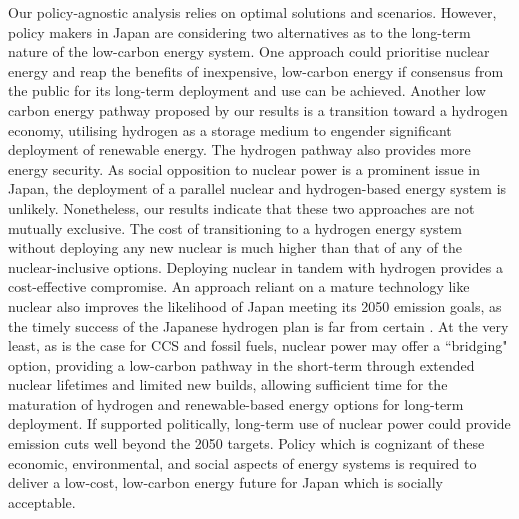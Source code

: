 Our policy-agnostic analysis relies on optimal solutions and scenarios. However, policy makers in Japan are considering two alternatives as to the long-term nature of the low-carbon energy system. One approach could prioritise nuclear energy and reap the benefits of inexpensive, low-carbon energy if consensus from the public for its long-term deployment and use can be achieved. Another low carbon energy pathway proposed by our results is a transition toward a hydrogen economy, utilising hydrogen as a storage medium to engender significant deployment of renewable energy. The hydrogen pathway also provides more energy security. As social opposition to nuclear power is a prominent issue in Japan, the deployment of a parallel nuclear and hydrogen-based energy system is unlikely. Nonetheless, our results indicate that these two approaches are not mutually exclusive. The cost of transitioning to a hydrogen energy system without deploying any new nuclear is much higher than that of any of the nuclear-inclusive options. Deploying nuclear in tandem with hydrogen provides a cost-effective compromise. An approach reliant on a mature technology like nuclear also improves the likelihood of Japan meeting its 2050 emission goals, as the timely success of the Japanese hydrogen plan is far from certain  . At the very least, as is the case for CCS and fossil fuels, nuclear power may offer a ``bridging" option, providing a low-carbon pathway in the short-term through extended nuclear lifetimes and limited new builds, allowing sufficient time for the maturation of hydrogen and renewable-based energy options for long-term deployment. If supported politically, long-term use of nuclear power could provide emission cuts well beyond the 2050 targets. Policy which is cognizant of these economic, environmental, and social aspects of energy systems is required to deliver a low-cost, low-carbon energy future for Japan which is socially acceptable.
